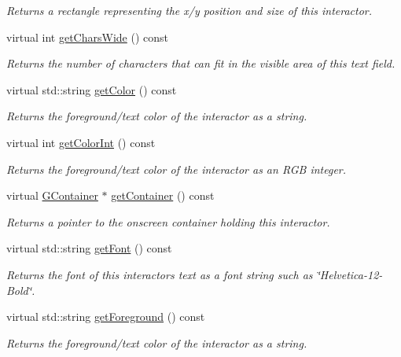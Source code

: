 \begin{DoxyCompactItemize}
\begin{DoxyCompactList}\small\item\em Returns a rectangle representing the x/y position and size of this interactor. \end{DoxyCompactList}\item 
virtual int \mbox{\hyperlink{classGTextField_acccdf98a090bca28752d04519a8b1a28}{get\+Chars\+Wide}} () const
\begin{DoxyCompactList}\small\item\em Returns the number of characters that can fit in the visible area of this text field. \end{DoxyCompactList}\item 
virtual std\+::string \mbox{\hyperlink{classGInteractor_aa061dfa488c31e18549d64363c1d0e34}{get\+Color}} () const
\begin{DoxyCompactList}\small\item\em Returns the foreground/text color of the interactor as a string. \end{DoxyCompactList}\item 
virtual int \mbox{\hyperlink{classGInteractor_a9635c7af766cdc3417f346683fa0e6c1}{get\+Color\+Int}} () const
\begin{DoxyCompactList}\small\item\em Returns the foreground/text color of the interactor as an R\+GB integer. \end{DoxyCompactList}\item 
virtual \mbox{\hyperlink{classGContainer}{G\+Container}} $\ast$ \mbox{\hyperlink{classGInteractor_a7a6e317c29d61030929b4cd2d1c00fe7}{get\+Container}} () const
\begin{DoxyCompactList}\small\item\em Returns a pointer to the onscreen container holding this interactor. \end{DoxyCompactList}\item 
virtual std\+::string \mbox{\hyperlink{classGInteractor_a894a5502900794eeb27d084c21f1d77d}{get\+Font}} () const
\begin{DoxyCompactList}\small\item\em Returns the font of this interactor\textquotesingle{}s text as a font string such as \char`\"{}\+Helvetica-\/12-\/\+Bold\char`\"{}. \end{DoxyCompactList}\item 
virtual std\+::string \mbox{\hyperlink{classGInteractor_a4fa2d8b0192a3a5b4af4bbfe71194d03}{get\+Foreground}} () const
\begin{DoxyCompactList}\small\item\em Returns the foreground/text color of the interactor as a string. \end{DoxyCompactList}\item 

\end{DoxyCompactItemize}
